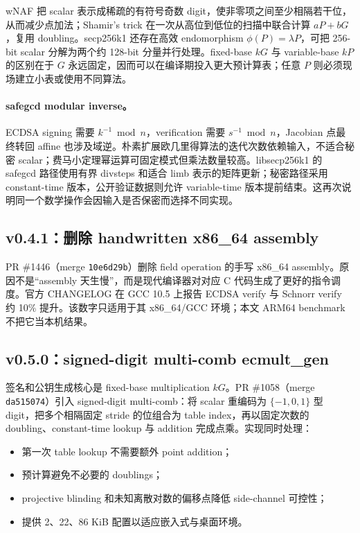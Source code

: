 \documentclass[11pt,a4paper,fontset=none]{ctexart}
\begin{document}
wNAF 把 scalar 表示成稀疏的有符号奇数 digit，使非零项之间至少相隔若干位，从而减少点加法；Shamir's trick 在一次从高位到低位的扫描中联合计算 $aP+bG$，复用 doubling。secp256k1 还存在高效 endomorphism $\phi(P)=\lambda P$，可把 256-bit scalar 分解为两个约 128-bit 分量并行处理。fixed-base $kG$ 与 variable-base $kP$ 的区别在于 $G$ 永远固定，因而可以在编译期投入更大预计算表；任意 $P$ 则必须现场建立小表或使用不同算法。

\paragraph{safegcd modular inverse。}
ECDSA signing 需要 $k^{-1}\bmod n$，verification 需要 $s^{-1}\bmod n$，Jacobian 点最终转回 affine 也涉及域逆。朴素扩展欧几里得算法的迭代次数依赖输入，不适合秘密 scalar；费马小定理幂运算可固定模式但乘法数量较高。libsecp256k1 的 safegcd 路径使用有界 divsteps 和适合 limb 表示的矩阵更新；秘密路径采用 constant-time 版本，公开验证数据则允许 variable-time 版本提前结束。这再次说明同一个数学操作会因输入是否保密而选择不同实现。

\subsection{v0.4.1：删除 handwritten x86\_64 assembly}

PR \#1446（merge \texttt{10e6d29b}）删除 field operation 的手写 x86\_64 assembly。原因不是“assembly 天生慢”，而是现代编译器对对应 C 代码生成了更好的指令调度。官方 CHANGELOG 在 GCC 10.5 上报告 ECDSA verify 与 Schnorr verify 约 10\% 提升。该数字只适用于其 x86\_64/GCC 环境；本文 ARM64 benchmark 不把它当本机结果。

\subsection{v0.5.0：signed-digit multi-comb ecmult\_gen}

签名和公钥生成核心是 fixed-base multiplication $kG$。PR \#1058（merge \texttt{da515074}）引入 signed-digit multi-comb：将 scalar 重编码为 $\{-1,0,1\}$ 型 digit，把多个相隔固定 stride 的位组合为 table index，再以固定次数的 doubling、constant-time lookup 与 addition 完成点乘。实现同时处理：

\begin{itemize}[leftmargin=2em]
  \item 第一次 table lookup 不需要额外 point addition；
  \item 预计算避免不必要的 doublings；
  \item projective blinding 和未知离散对数的偏移点降低 side-channel 可控性；
  \item 提供 2、22、86 KiB 配置以适应嵌入式与桌面环境。
\end{itemize}
\end{document}
